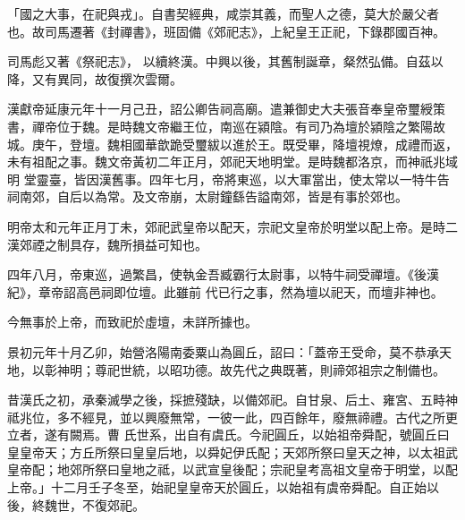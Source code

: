 
\begin{pinyinscope}

 「國之大事，在祀與戎」。自書契經典，咸崇其義，而聖人之德，莫大於嚴父者也。故司馬遷著《封禪書》，班固備《郊祀志》，上紀皇王正祀，下錄郡國百神。



 司馬彪又著《祭祀志》，
 以續終漢。中興以後，其舊制誕章，粲然弘備。自茲以降，又有異同，故復撰次雲爾。



 漢獻帝延康元年十一月己丑，詔公卿告祠高廟。遣兼御史大夫張音奉皇帝璽綬策書，禪帝位于魏。是時魏文帝繼王位，南巡在潁陰。有司乃為壇於潁陰之繁陽故城。庚午，登壇。魏相國華歆跪受璽紱以進於王。既受畢，降壇視燎，成禮而返，未有祖配之事。魏文帝黃初二年正月，郊祀天地明堂。是時魏都洛京，而神祇兆域明
 堂靈臺，皆因漢舊事。四年七月，帝將東巡，以大軍當出，使太常以一特牛告祠南郊，自后以為常。及文帝崩，太尉鐘繇告謚南郊，皆是有事於郊也。



 明帝太和元年正月丁未，郊祀武皇帝以配天，宗祀文皇帝於明堂以配上帝。是時二漢郊禋之制具存，魏所損益可知也。



 四年八月，帝東巡，過繁昌，使執金吾臧霸行太尉事，以特牛祠受禪壇。《後漢紀》，章帝詔高邑祠即位壇。此雖前
 代已行之事，然為壇以祀天，而壇非神也。



 今無事於上帝，而致祀於虛壇，未詳所據也。



 景初元年十月乙卯，始營洛陽南委粟山為圓丘，詔曰：「蓋帝王受命，莫不恭承天地，以彰神明；尊祀世統，以昭功德。故先代之典既著，則禘郊祖宗之制備也。



 昔漢氏之初，承秦滅學之後，採摭殘缺，以備郊祀。自甘泉、后土、雍宮、五畤神祗兆位，多不經見，並以興廢無常，一彼一此，四百餘年，廢無禘禮。古代之所更立者，遂有闕焉。曹
 氏世系，出自有虞氏。今祀圓丘，以始祖帝舜配，號圓丘曰皇皇帝天；方丘所祭曰皇皇后地，以舜妃伊氏配；天郊所祭曰皇天之神，以太祖武皇帝配；地郊所祭曰皇地之祗，以武宣皇後配；宗祀皇考高祖文皇帝于明堂，以配上帝。」十二月壬子冬至，始祀皇皇帝天於圓丘，以始祖有虞帝舜配。自正始以後，終魏世，不復郊祀。




\end{pinyinscope}
